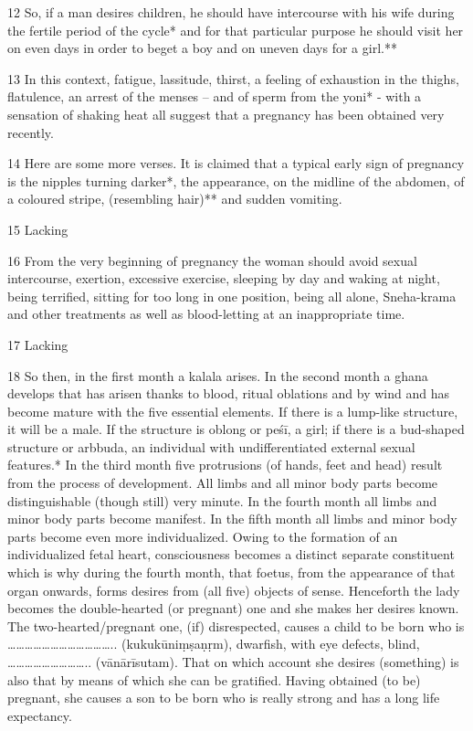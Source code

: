 \begin{translation}
\begin{tt}
\item[12]So, if a man desires children, he should have intercourse with his wife 
during the fertile period of the cycle* and for that particular purpose he should 
visit her on even days in order to beget a boy and on uneven days for a girl.**

\item[13]In this context, fatigue, lassitude, thirst, a feeling of exhaustion in the 
thighs, flatulence, an arrest of the menses – and of sperm from the yoni* - with a 
sensation of shaking heat all suggest that a pregnancy has been obtained very 
recently.

\item[14]Here are some more verses. It is claimed that a typical early sign of 
pregnancy is the nipples turning darker*, the appearance, on the midline of the 
abdomen, of a coloured stripe, (resembling hair)** and sudden vomiting.

\item[15] Lacking

\item[16]From the very beginning of pregnancy the woman should avoid sexual 
intercourse, exertion, excessive exercise, sleeping by day and waking at night, 
being terrified, sitting for too long in one position, being all alone, Sneha-krama 
and other treatments as well as blood-letting at an inappropriate time.


\item[17] Lacking

\item[18]So then, in the first month a kalala arises. In the second month a ghana 
develops that has arisen thanks to blood, ritual oblations and by wind and has 
become mature with the five essential elements. If there is a lump-like structure, 
it will be a male. If the structure is oblong or peśī, a girl; if there is a bud-shaped 
structure  or arbbuda, an individual with undifferentiated external sexual 
features.* In the third month five protrusions (of hands, feet and head) result 
from the process of development.  All limbs and all minor body parts become 
distinguishable (though still) very minute. In the fourth month all limbs and minor 
body parts become manifest. In the fifth month all limbs and minor body parts 
become even more individualized. Owing to the formation of an individualized 
fetal heart, consciousness becomes a distinct separate constituent which is why 
during the fourth month, that foetus, from the appearance of that organ onwards, 
forms desires from (all five) objects of sense. Henceforth the lady becomes the 
double-hearted (or pregnant) one and she makes her desires known.  The 
two-hearted/pregnant one, (if) disrespected, causes a child to be born who is  
……………………………….. (kukukūniṃṣaṇṛm),  dwarfish, with eye defects, blind, 
……………………….. (vānārīsutam). That on which account she desires 
(something) is also that by means of which she can be gratified. Having obtained 
(to be) pregnant, she causes a son to be born who is really strong and has a long 
life expectancy. 


\end{tt}
\end{translation}
